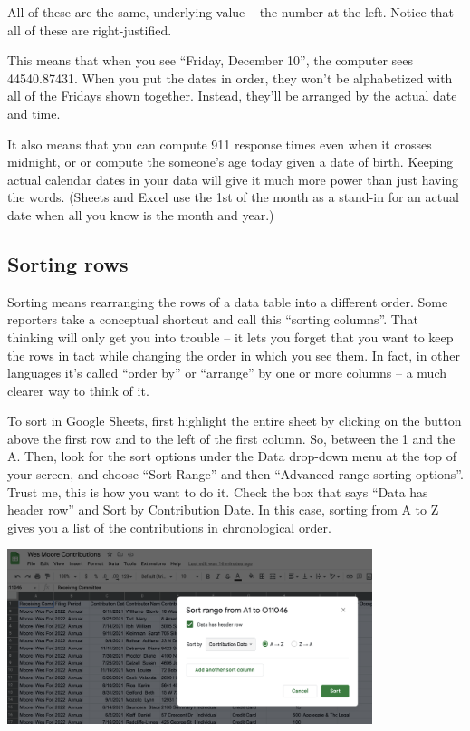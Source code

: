 \documentclass[
  letterpaper,
  DIV=11,
  numbers=noendperiod]{scrreprt}
\begin{document}
All of these are the same, underlying value -- the number at the left.
Notice that all of these are right-justified.

This means that when you see ``Friday, December 10'', the computer sees
44540.87431. When you put the dates in order, they won't be alphabetized
with all of the Fridays shown together. Instead, they'll be arranged by
the actual date and time.

It also means that you can compute 911 response times even when it
crosses midnight, or or compute the someone's age today given a date of
birth. Keeping actual calendar dates in your data will give it much more
power than just having the words. (Sheets and Excel use the 1st of the
month as a stand-in for an actual date when all you know is the month
and year.)

\hypertarget{sorting-rows}{%
\subsection{Sorting rows}\label{sorting-rows}}

Sorting means rearranging the rows of a data table into a different
order. Some reporters take a conceptual shortcut and call this ``sorting
columns''. That thinking will only get you into trouble -- it lets you
forget that you want to keep the rows in tact while changing the order
in which you see them. In fact, in other languages it's called ``order
by'' or ``arrange'' by one or more columns -- a much clearer way to
think of it.

To sort in Google Sheets, first highlight the entire sheet by clicking
on the button above the first row and to the left of the first column.
So, between the 1 and the A. Then, look for the sort options under the
Data drop-down menu at the top of your screen, and choose ``Sort Range''
and then ``Advanced range sorting options''. Trust me, this is how you
want to do it. Check the box that says ``Data has header row'' and Sort
by Contribution Date. In this case, sorting from A to Z gives you a list
of the contributions in chronological order.

\includegraphics[width=0.8\textwidth,height=\textheight]{./images/sheets-filter-sort-sortbox.png}
\end{document}
